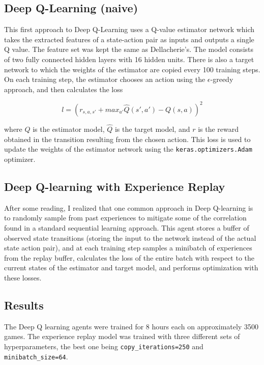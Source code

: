 \documentclass[11pt]{article}
\begin{document}
\hypertarget{deep-q-learning-naive}{%
\subsection{Deep Q-Learning (naive)}\label{deep-q-learning-naive}}

This first approach to Deep Q-Learning uses a Q-value estimator network
which takes the extracted features of a state-action pair as inputs and
outputs a single Q value. The feature set was kept the same as
Dellacherie's. The model consists of two fully connected hidden layers
with 16 hidden units. There is also a target network to which the
weights of the estimator are copied every 100 training steps. On each
training step, the estimator chooses an action using the
\(\epsilon\)-greedy approach, and then calculates the loss

\[l = (r_{s,a,s'} + max_{a'}\hat{Q}(s', a') - Q(s, a))^2\]

where \(Q\) is the estimator model, \(\hat{Q}\) is the target model, and
\(r\) is the reward obtained in the transition resulting from the chosen
action. This loss is used to update the weights of the estimator network
using the \texttt{keras.optimizers.Adam} optimizer.

\hypertarget{deep-q-learning-with-experience-replay}{%
\subsection{Deep Q-learning with Experience
Replay}\label{deep-q-learning-with-experience-replay}}

After some reading, I realized that one common approach in Deep
Q-learning is to randomly sample from past experiences to mitigate some
of the correlation found in a standard sequential learning approach.
This agent stores a buffer of observed state transitions (storing the
input to the network instead of the actual state action pair), and at
each training step samples a minibatch of experiences from the replay
buffer, calculates the loss of the entire batch with respect to the
current states of the estimator and target model, and performs
optimization with these losses.

\hypertarget{results}{%
\subsection{Results}\label{results}}

The Deep Q learning agents were trained for 8 hours each on
approximately 3500 games. The experience replay model was trained with
three different sets of hyperparameters, the best one being
\texttt{copy\_iterations=250} and \texttt{minibatch\_size=64}.
\end{document}

